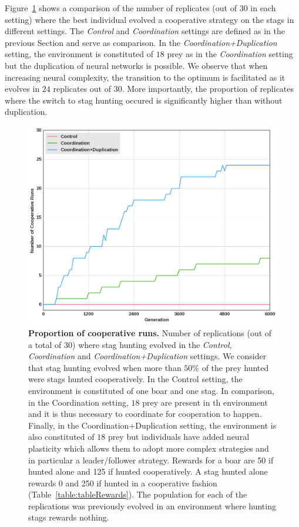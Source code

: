     Figure~\ref{fig:figRecyclingLeadership} shows a comparison of the number of replicates (out of $30$ in each setting) where the best individual evolved a cooperative strategy on the stags in different settings. The \emph{Control} and \emph{Coordination} settings are defined as in the previous Section and serve as comparison. In the \emph{Coordination+Duplication} setting, the environment is constituted of $18$ prey as in the \emph{Coordination} setting but the duplication of neural networks is possible. We observe that when increasing neural complexity, the transition to the optimum is facilitated as it evolves in $24$ replicates out of $30$. More importantly, the proportion of replicates where the switch to stag hunting occured is significantly higher than without duplication. 

    \begin{figure}[h]
      \centering
        \includegraphics[width=0.7\linewidth]{fig/ArticleBio2/Fig4.png}
        \caption{\textbf{Proportion of cooperative runs.}
        Number of replications (out of a total of $30$) where stag hunting evolved in the \emph{Control}, \emph{Coordination} and \emph{Coordination+Duplication} settings. We consider that stag hunting evolved when more than $50\%$ of the prey hunted were stags hunted cooperatively. In the Control setting, the environment is constituted of one boar and one stag. In comparison, in the Coordination setting, $18$ prey are present in th environment and it is thus necessary to coordinate for cooperation to happen. Finally, in the Coordination+Duplication setting, the environment is also constituted of $18$ prey but individuals have added neural plasticity which allows them to adopt more complex strategies and in particular a leader/follower strategy. Rewards for a boar are 50 if hunted alone and 125 if hunted cooperatively. A stag hunted alone rewards 0 and 250 if hunted in a cooperative fashion (Table~\ref{table:tableRewards}). The population for each of the replications was previously evolved in an environment where hunting stags rewards nothing.}
      \label{fig:figRecyclingLeadership}
    \end{figure}

